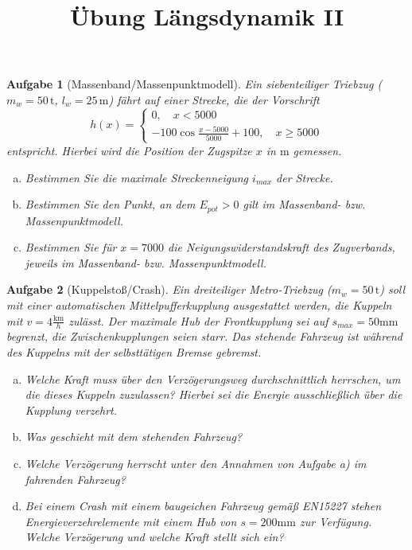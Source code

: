 \documentclass[11pt,a4paper,headsepline]{scrartcl}
\title{\"Ubung L\"angsdynamik II}
\date{}
\newtheorem{aufgabe}{Aufgabe}
\begin{document}
\maketitle
\thispagestyle{fancy}
\pagestyle{fancy}
\vspace{-2cm}

\begin{aufgabe}[Massenband/Massenpunktmodell]
Ein siebenteiliger Triebzug ($m_{w} = 50 \, \mathrm{t}$, $l_{w} = 25 \, \mathrm{m}$) f\"ahrt auf einer Strecke, die der Vorschrift 
 \begin{equation*}
h(x) = 
\begin{cases}
 0, \quad x < 5000 \\
 - 100 \cos \frac{x-5000}{5000} + 100, \quad x \geq 5000
\end{cases}
\end{equation*}
entspricht. Hierbei wird die Position der Zugspitze $x$ in $\mathrm{m}$ gemessen.
\begin{enumerate}[a)]
\item Bestimmen Sie die maximale Streckenneigung $i_{max}$ der Strecke.
\item Bestimmen Sie den Punkt, an dem $E_{pot} > 0$ gilt im Massenband- bzw. Massenpunktmodell.
\item Bestimmen Sie f\"ur $x = 7000$ die Neigungswiderstandskraft des Zugverbands, jeweils im Massenband- bzw. Massenpunktmodell.
\end{enumerate}

\end{aufgabe}
\vspace{.5cm}
\begin{aufgabe}[Kuppelsto{\ss}/Crash]
Ein dreiteiliger Metro-Triebzug ($m_{w} = 50 \, \mathrm{t}$) soll mit einer automatischen Mittelpufferkupplung ausgestattet werden, die Kuppeln mit $v = 4 \frac{\mathrm{km}}{{h}}$ zul\"asst. Der maximale Hub der Frontkupplung sei auf $s_{max} = 50 \mathrm{mm}$ begrenzt, die Zwischenkupplungen seien starr. Das stehende Fahrzeug ist w\"ahrend des Kuppelns mit der selbstt\"atigen Bremse gebremst.
\begin{enumerate}[a)]
\item Welche Kraft muss \"uber den Verz\"ogerungsweg durchschnittlich herrschen, um die dieses Kuppeln zuzulassen? Hierbei sei die Energie ausschlie{\ss}lich \"uber die Kupplung verzehrt.
\item Was geschieht mit dem stehenden Fahrzeug?
\item Welche Verz\"ogerung herrscht unter den Annahmen von Aufgabe a) im fahrenden Fahrzeug?
\item Bei einem Crash mit einem baugeichen Fahrzeug 
gem\"a{\ss} EN15227 stehen Energieverzehrelemente mit einem Hub von $s = 200 \mathrm{mm}$ zur Verf\"ugung. Welche Verz\"ogerung und welche Kraft stellt sich ein?
\end{enumerate}
\end{aufgabe}
\end{document}

